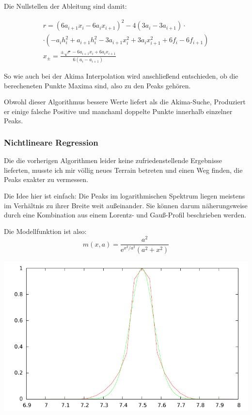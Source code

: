 \documentclass[10pt,a4paper,german]{scrartcl}
\begin{document}
    	Die Nullstellen der Ableitung sind damit:

      \begin{multline}
        r = (6 a_{i+1} x_i-6 a_i x_{i+1})^2 -4 (3 a_i-3 a_{i+1})\cdot\\
        \cdot\left(-a_i h_i^2+a_{i+1} h_i^2-3 a_{i+1} x_i^2+3 a_i x_{i+1}^2+6 f_i-6
        f_{i+1}\right) \\
        x_{\pm} = \frac{\pm\sqrt{r}-6 a_{i+1} x_i+6 a_i x_{i+1}}{6 (a_i-a_{i+1})}
       \end{multline}
       
       So wie auch bei der Akima Interpolation wird anschließend entschieden, ob
       die berecheneten Punkte Maxima sind, also zu den Peaks gehören.
       
       Obwohl dieser Algorithmus bessere Werte liefert als die Akima-Suche,
       Produziert er einige falsche Positive und manchaml doppelte Punkte
       innerhalb einzelner Peaks.
       
     \subsubsection*{Nichtlineare Regression}
       Die die vorherigen Algorithmen leider keine zufriedenstellende Ergebnisse
       lieferten, musste ich mir völlig neues Terrain betreten und einen Weg
       finden, die Peaks exakter zu vermessen.
       
       Die Idee hier ist einfach: Die Peaks im logarithmischen Spektrum
       liegen meistens im Verhältnis zu ihrer Breite weit außeinander.
       Sie können darum näherungsweise durch eine Kombination aus
       einem Lorentz- und Gauß-Profil beschrieben werden.

       Die Modellfunktion ist also:
       \begin{equation}
         m(x, a) = \frac{a^2}{\mathrm{e}^{x^2/a^2} (a^2 + x^2)}
       \end{equation}
       
       \includegraphics[scale=.62]{../static/model.pdf}
       
\end{document}
